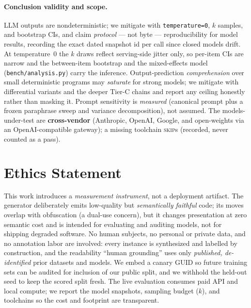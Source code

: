 \documentclass[11pt]{article}
\begin{document}
\paragraph{Conclusion validity and scope.} LLM outputs are nondeterministic; we mitigate
with \texttt{temperature=0}, $k$ samples, and bootstrap CIs, and claim \emph{protocol} ---
not byte --- reproducibility for model results, recording the exact dated snapshot id per
call since closed models drift. At temperature~0 the $k$ draws reflect serving-side jitter
only, so per-item CIs are narrow and the between-item bootstrap and the mixed-effects model
(\texttt{bench/analysis.py}) carry the inference. Output-prediction \emph{comprehension}
over small deterministic programs may \emph{saturate} for strong models; we mitigate with
differential variants and the deeper Tier-C chains and report any ceiling honestly rather
than masking it. Prompt sensitivity is \emph{measured} (canonical prompt plus a frozen
paraphrase sweep and variance decomposition), not assumed. The models-under-test are
\textbf{cross-vendor} (Anthropic, OpenAI, Google, and open-weights via an OpenAI-compatible
gateway); a missing toolchain \textsc{skip}s (recorded, never counted as a pass).

\section*{Ethics Statement}
This work introduces a \emph{measurement instrument}, not a deployment artifact. The
generator deliberately emits low-quality but \emph{semantically faithful} code; its moves
overlap with obfuscation (a dual-use concern), but it changes presentation at zero
semantic cost and is intended for evaluating and auditing models, not for shipping
degraded software. No human subjects, no personal or private data, and no annotation labor
are involved: every instance is synthesized and labelled by construction, and the
readability ``human grounding'' uses only \emph{published, de-identified} prior datasets
and models. We embed a canary GUID so future training sets can be audited for inclusion of
our public split, and we withhold the held-out seed to keep the scored split fresh. The
live evaluation consumes paid API and local compute; we report the model snapshots,
sampling budget ($k$), and toolchains so the cost and footprint are transparent.


\end{document}

